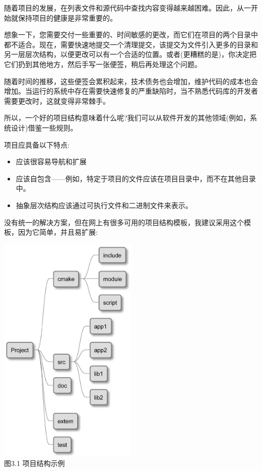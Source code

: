 随着项目的发展，在列表文件和源代码中查找内容变得越来越困难。因此，从一开始就保持项目的健康是非常重要的。

想象一下，您需要交付一些重要的、时间敏感的更改，而它们在项目的两个目录中都不适合。现在，需要快速地提交一个清理提交，该提交为文件引入更多的目录和另一层层次结构，以便更改可以有一个合适的位置。或者(更糟糕的是)，你决定把它们扔到其他地方，然后手写一张便签，稍后再处理这个问题。

随着时间的推移，这些便签会累积起来，技术债务也会增加，维护代码的成本也会增加。当运行的系统中存在需要快速修复的严重缺陷时，当不熟悉代码库的开发者需要更改时，这就变得非常棘手。

所以，一个好的项目结构意味着什么呢?我们可以从软件开发的其他领域(例如，系统设计)借鉴一些规则。

项目应具备以下特点:

\begin{itemize}
\item 
应该很容易导航和扩展

\item 
应该自包含——例如，特定于项目的文件应该在项目目录中，而不在其他目录中。

\item 
抽象层次结构应该通过可执行文件和二进制文件来表示。
\end{itemize}

没有统一的解决方案，但在网上有很多可用的项目结构模板，我建议采用这个模板，因为它简单，并且易扩展:

\begin{center}
\includegraphics[width=0.5\textwidth]{content/1/chapter3/images/1.jpg}\\
图3.1 项目结构示例
\end{center}

